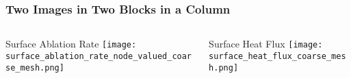 \documentclass[mathserif]{beamer}
\begin{document}
\begin{frame}
\frametitle{Two Images in Two Blocks in a Column}
\begin{columns}[c]
\begin{column}{5.5cm}
\begin{block}{Surface Ablation Rate}
\texttt{[image: surface\_ablation\_rate\_node\_valued\_coarse\_mesh.png]}
\end{block}
\end{column}
\begin{column}{5.5cm}
\begin{block}{Surface Heat Flux}
\texttt{[image: surface\_heat\_flux\_coarse\_mesh.png]}
\end{block}
\end{column}
\end{columns}
\end{frame}
\end{document}
